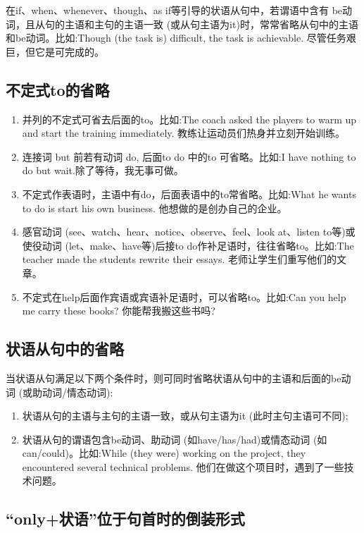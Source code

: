在if、when、whenever、though、as if等引导的状语从句中，若谓语中含有 be动词，且从句的主语和主句的主语一致 (或从句主语为it)时，常常省略从句中的主语和be动词。比如:Though (the task is) difficult, the task is achievable. 尽管任务艰巨，但它是可完成的。

\subsection{不定式to的省略}

\begin{enumerate}
  \item 并列的不定式可省去后面的to。比如:The coach asked the players to warm up and start the training immediately. 教练让运动员们热身并立刻开始训练。
  \item 连接词 but 前若有动词 do, 后面to do 中的to 可省略。比如:I have nothing to do but wait.除了等待，我无事可做。
  \item 不定式作表语时，主语中有do，后面表语中的to常省略。比如:What he wants to do is start his own business. 他想做的是创办自己的企业。
  \item 感官动词 (see、watch、hear、notice、observe、feel、look at、listen to等)或使役动词 (let、make、have等)后接to do作补足语时，往往省略to。比如:The teacher made the students rewrite their essays. 老师让学生们重写他们的文章。
  \item 不定式在help后面作宾语或宾语补足语时，可以省略to。比如:Can you help me carry these books? 你能帮我搬这些书吗?
\end{enumerate}

\subsection{状语从句中的省略}

当状语从句满足以下两个条件时，则可同时省略状语从句中的主语和后面的be动词 (或助动词/情态动词):
\begin{enumerate}
  \item 状语从句的主语与主句的主语一致，或从句主语为it (此时主句主语可不同);
  \item 状语从句的谓语包含be动词、助动词 (如have/has/had)或情态动词 (如can/could)。比如:While (they were) working on the project, they encountered several technical problems. 他们在做这个项目时，遇到了一些技术问题。
\end{enumerate}

\subsection{“only+状语”位于句首时的倒装形式}

